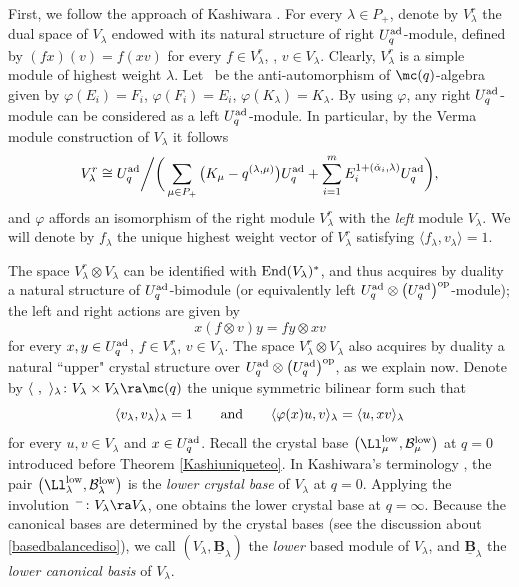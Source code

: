 First, we follow the approach of Kashiwara \cite{Kashiwara2,Kashiwara3}. For every $\lambda\in P_+$, denote by $V_\lambda^r$ the dual space of $V_\lambda$ endowed with its natural structure of right $U_q^{\rm ad}$-module, defined by ${(f x)(v) = f(xv)}$
for every $f\in V_\lambda^r$, , $v\in V_\lambda$.
Clearly, $V_\lambda^r$ is a simple module of highest weight $\lambda$.
 Let~ be the anti-automorphism of $\mc(q)$-algebra given by $\varphi(E_i) = F_i$, $\varphi(F_i) = E_i$, $\varphi(K_\lambda) = K_{\lambda}$. By using $\varphi$, any right $U_q^{\rm ad}$-module can be considered as a left $U_q^{\rm ad}$-module. In particular, by the Verma module construction of $V_\lambda$ it follows
\[V_\lambda^r \cong U_q^{\rm ad}\bigg/\bigg(\sum_{\mu\in P_+} \big(K_\mu -q^{(\lambda,\mu)}\big)U_q^{\rm ad}+ \sum_{i=1}^m E_i^{1+(\check{\alpha}_i,\lambda)}U_q^{\rm ad}\bigg),\]
and $\varphi$ affords an isomorphism of the right module $V_\lambda^r$ with the {\it left} module $V_\lambda$. We will denote by $f_\lambda$ the unique highest weight vector of $V_\lambda^r$ satisfying $\langle f_\lambda,v_\lambda\rangle = 1$.

The space $V_\lambda^r \otimes V_\lambda$ can be identified with ${\rm End}(V_\lambda)^*$, and thus acquires by duality a natural structure of $U_q^{\rm ad}$-bimodule \big(or equivalently left $U_q^{\rm ad} \otimes \big(U_q^{\rm ad}\big)^{\rm op}$-module\big); the left and right actions are given by
\begin{equation}\label{bimodaction}x(f \otimes v)y = fy \otimes xv
\end{equation}
for every $x,y\in U_q^{\rm ad}$, $f\in V_\lambda^r$, $v\in V_\lambda$. The space $V_\lambda^r \otimes V_\lambda$ also acquires by duality a natural ``upper" crystal structure over $U_q^{\rm ad} \otimes \big(U_q^{\rm ad}\big)^{\rm op}$, as we explain now. Denote by $\langle \ ,\ \rangle_\lambda \colon V_\lambda \times V_\lambda \ra \mc(q)$ the unique symmetric bilinear form such that
\begin{equation}\label{proppairinglambda}
\langle v_\lambda,v_\lambda\rangle_\lambda =1\qquad{\rm and}\qquad \langle \varphi(x)u,v\rangle_\lambda = \langle u, xv\rangle_\lambda
\end{equation}
for every $u,v\in V_\lambda$ and $x\in U_q^{\rm ad}$. Recall the crystal base $\big(\Ll_\mu^{\rm low},\mathcal{B}_\mu^{\rm low}\big)$ at $q=0$ introduced before Theorem \ref{Kashiuniqueteo}. In Kashiwara's terminology \cite{Kashiwara1, Kashiwara2}, the pair $\big(\Ll_{\lambda}^{\rm low},\mathcal{B}_\lambda^{\rm low}\big)$ is the {\it lower crystal base} of $V_\lambda$ at $q=0$. Applying the involution ${}^-\colon V_\lambda\ra V_\lambda$, one obtains the lower crystal base  at $q=\infty$. Because the canonical bases are determined by the crystal bases (see the discussion about \eqref{basedbalancediso}), we call $(V_\lambda,\underline{\mathbf{B}}_\lambda)$ the {\it lower} based module of $V_\lambda$, and $\underline{\mathbf{B}}_\lambda$ the {\it lower canonical basis} of $V_\lambda$.

